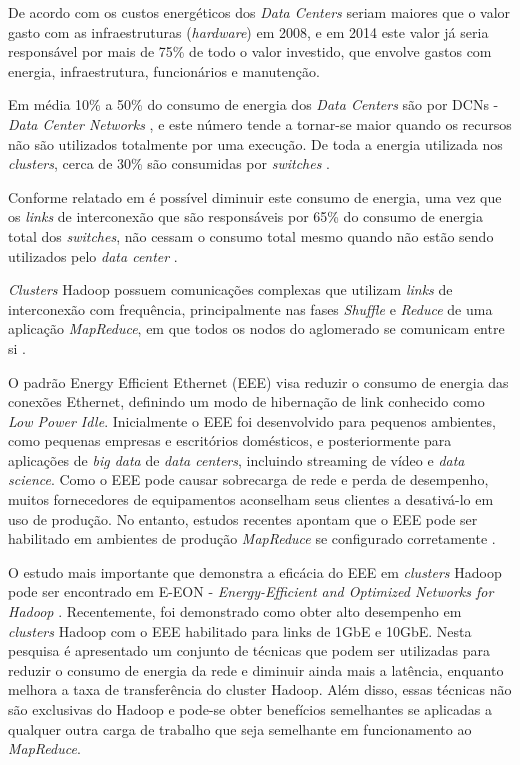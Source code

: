 De acordo com \cite{belady2007data} os custos energéticos dos \emph{Data Centers} seriam maiores que o valor gasto com as infraestruturas (\emph{hardware}) em 2008, e em 2014 este valor já seria responsável por mais de 75\% de todo o valor investido, que envolve gastos com energia, infraestrutura, funcionários e manutenção.

Em média 10\% a 50\% do consumo de energia dos \emph{Data Centers} são por DCNs - \emph{Data Center Networks} \cite{abts2010energy}, e este número tende a tornar-se maior quando os recursos não são utilizados totalmente por uma execução. De toda a energia utilizada nos \emph{clusters}, cerca de 30\% são consumidas por \emph{switches}  \cite{kliazovich2012greencloud}.

Conforme relatado em \cite{mahadevan2009energy} é possível diminuir este consumo de energia, uma vez que os \emph{links} de interconexão que são responsáveis por 65\% do consumo de energia total dos \emph{switches}, não cessam o consumo total mesmo quando não estão sendo utilizados pelo \emph{data center} \cite{christensen2010ieee}.

\emph{Clusters} Hadoop possuem comunicações complexas que utilizam \emph{links} de interconexão com frequência, principalmente nas fases \emph{Shuffle} e \emph{Reduce} de uma aplicação \emph{MapReduce}, em que todos os nodos do aglomerado se comunicam entre si \cite{dean2004mapreduce}.

O padrão Energy Efficient Ethernet (EEE) visa reduzir o consumo de energia das conexões Ethernet, definindo um modo de hibernação de link conhecido como \emph{Low Power Idle}. Inicialmente o EEE foi desenvolvido para pequenos ambientes, como pequenas empresas e escritórios domésticos, e posteriormente para aplicações de \emph{big data} de \emph{data centers}, incluindo streaming de vídeo e \emph{data science}. Como o EEE pode causar sobrecarga de rede e perda de desempenho, muitos fornecedores de equipamentos aconselham seus clientes a desativá-lo em uso de produção. No entanto, estudos recentes apontam que o EEE pode ser habilitado em ambientes de produção \emph{MapReduce} se configurado corretamente \cite{e2015exploring} \cite{e2017energy}.

O estudo mais importante que demonstra a eficácia do EEE em \emph{clusters} Hadoop pode ser encontrado em E-EON - \emph{Energy-Efficient and Optimized Networks for Hadoop} \cite{silva2018eon}. Recentemente, foi demonstrado como obter alto desempenho em \emph{clusters} Hadoop com o EEE habilitado para links de 1GbE e 10GbE. Nesta pesquisa é apresentado um conjunto de técnicas que podem ser utilizadas para reduzir o consumo de energia da rede e diminuir ainda mais a latência, enquanto melhora a taxa de transferência do cluster Hadoop. Além disso, essas técnicas não são exclusivas do Hadoop e pode-se obter benefícios semelhantes se aplicadas a qualquer outra carga de trabalho que seja semelhante em funcionamento ao \emph{MapReduce}.

